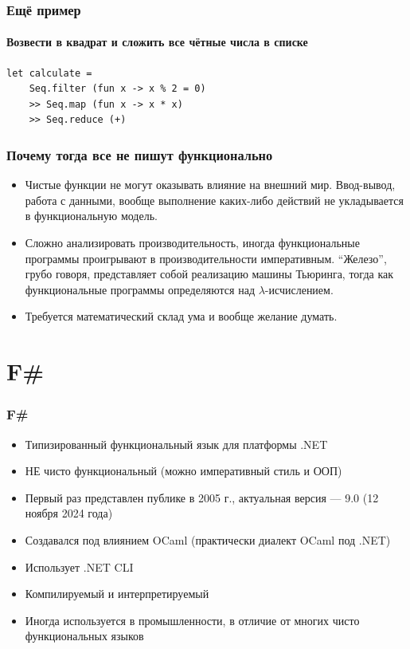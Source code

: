 \documentclass{../../slides-style}
\begin{document}
    \begin{frame}[fragile]
        \frametitle{Ещё пример}
        \framesubtitle{Возвести в квадрат и сложить все чётные числа в списке}
        \begin{verbatim}
let calculate = 
    Seq.filter (fun x -> x % 2 = 0) 
    >> Seq.map (fun x -> x * x) 
    >> Seq.reduce (+)
        \end{verbatim}
    \end{frame}

    \begin{frame}
        \frametitle{Почему тогда все не пишут функционально}
        \begin{itemize}
            \item Чистые функции не могут оказывать влияние на внешний мир. Ввод-вывод, работа с данными,
                    вообще выполнение каких-либо действий не укладывается в функциональную модель.
            \item Сложно анализировать производительность, иногда функциональные программы проигрывают
                    в производительности императивным. \enquote{Железо}, грубо говоря, представляет собой 
                    реализацию машины Тьюринга, тогда как функциональные программы определяются над
                    $\lambda$-исчислением.
            \item Требуется математический склад ума и вообще желание думать.
        \end{itemize}
    \end{frame}

    \section{F\#}

    \begin{frame}
        \frametitle{F\#}
        \begin{itemize}
            \item Типизированный функциональный язык для платформы .NET
            \item НЕ чисто функциональный (можно императивный стиль и ООП)
            \item Первый раз представлен публике в 2005 г., актуальная версия --- 9.0 (12 ноября 2024 года)
            \item Создавался под влиянием OCaml (практически диалект OCaml под .NET)
            \item Использует .NET CLI
            \item Компилируемый и интерпретируемый
            \item Иногда используется в промышленности, в отличие от многих чисто функциональных языков
        \end{itemize}
    \end{frame}
\end{document}
